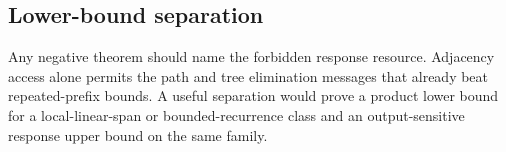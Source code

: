 \subsection{Lower-bound separation}

Any negative theorem should name the forbidden response resource.  Adjacency
access alone permits the path and tree elimination messages that already beat
repeated-prefix bounds.  A useful separation would prove a product lower bound
for a local-linear-span or bounded-recurrence class and an output-sensitive
response upper bound on the same family.
